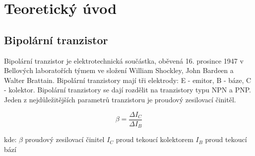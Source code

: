 \section*{Teoretický úvod}
		\subsection*{Bipolární tranzistor}
			\indent\indent
			Bipolární tranzistor je elektrotechnická součástka, oběvená 16. prosince 1947 v Bellových laboratořích týmem ve složení William Shockley, John Bardeen a Walter Brattain. Bipolární tranzistory mají tři elektrody: E - emitor, B - báze, C - kolektor. Bipolární tranzistory se dají rozdělit na tranzistory typu NPN a PNP. Jeden z nejdůležitějších parametrů tranzistoru je proudový zesilovací činitěl.
			
		\begin{equation}
  		\beta = \dfrac{\Delta I_C}{\Delta I_B}
  	\end{equation}
		
		\hspace*{2cm}kde:\newline    
  	\hspace*{4cm}$\beta$ \dotfill proudový zesilovací činitel\hspace*{4cm}\newline
  	\hspace*{4cm}$I_C$ \dotfill proud tekoucí kolektorem\hspace*{4cm}\newline
  	\hspace*{4cm}$I_B$ \dotfill proud tekoucí bází\hspace*{4cm}\newline
  				
